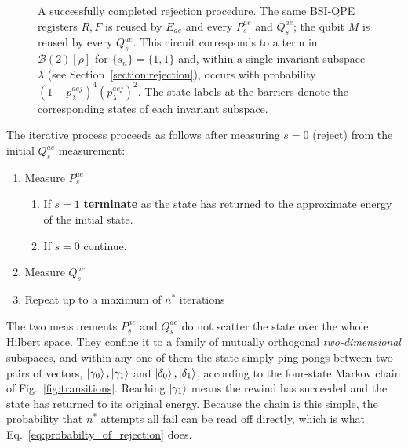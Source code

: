 \documentclass[aps,floatfix,10pt,amssymb,amsfont,amsmath,superscriptaddress,float,nofootinbib,longbibliography,nobalancelastpage,twocolumn]{revtex4-2}
\begin{document}
\begin{figure}
\caption{A successfully completed rejection procedure. The same BSI-QPE registers $R, F$ is reused by $E_{ae}$ and every $P_s^{ae}$ and $Q_s^{ae}$; the qubit $M$ is reused by every $Q_s^{ae}$. This circuit corresponds to a term in $\mathcal{B}(2)[\rho]$ for $\{s_n\}=\{1,1\}$ and, within a single invariant subspace $\lambda$ (see Section~\ref{section:rejection}), occurs with probability $(1-p^{aej}_{\lambda})^4(p^{aej}_{\lambda})^2$. The state labels at the barriers denote the corresponding states of each invariant subspace.}
\label{fig:fullcircuit}
\end{figure}

The iterative process proceeds as follows after measuring $s=0$ (reject) from the initial $Q_s^{ae}$ measurement: 
\begin{enumerate}
    \item Measure $P_s^{ae}$
        \begin{enumerate}
            \item If $s=1$ \textbf{terminate} as the state has returned to the approximate energy of the initial state.
            \item If $s=0$ continue.
        \end{enumerate}
    \item Measure $Q_s^{ae}$
    \item Repeat up to a maximum of $n^*$ iterations
\end{enumerate}
The two measurements $P^{ae}_s$ and $Q^{ae}_s$ do not scatter the state over the whole Hilbert space. They confine it to a family of mutually orthogonal \emph{two-dimensional} subspaces, and within any one of them the state simply ping-pongs between two pairs of vectors, $\ket{\gamma_0},\ket{\gamma_1}$ and $\ket{\delta_0},\ket{\delta_1}$, according to the four-state Markov chain of Fig.~\ref{fig:transitions}. Reaching $\ket{\gamma_1}$ means the rewind has succeeded and the state has returned to its original energy. Because the chain is this simple, the probability that $n^*$ attempts all fail can be read off directly, which is what Eq.~\eqref{eq:probabilty_of_rejection} does. 
\end{document}
